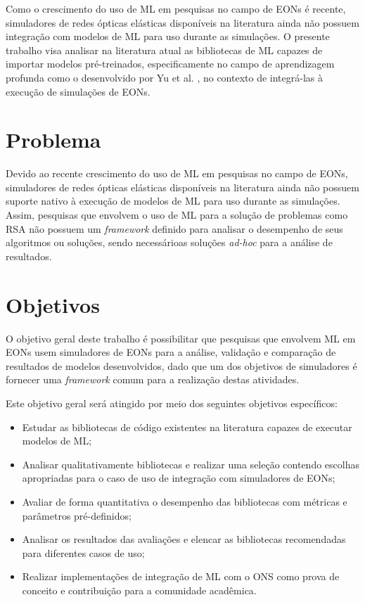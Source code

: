 Como o crescimento do uso de ML em pesquisas no campo de EONs é recente, simuladores de redes ópticas elásticas disponíveis na literatura ainda não possuem integração com modelos de ML para uso durante as simulações. O presente trabalho visa analisar na literatura atual as bibliotecas de ML capazes de importar modelos pré-treinados, especificamente no campo de aprendizagem profunda como o desenvolvido por Yu et al. \cite{eon_ml_rsa_dl_2019}, no contexto de integrá-las à execução de simulações de EONs.

\section{Problema}
\label{intro-problem}

Devido ao recente crescimento do uso de ML em pesquisas no campo de EONs, simuladores de redes ópticas elásticas disponíveis na literatura ainda não possuem suporte nativo à execução de modelos de ML para uso durante as simulações. Assim, pesquisas que envolvem o uso de ML para a solução de problemas como RSA não possuem um \textit{framework} definido para analisar o desempenho de seus algoritmos ou soluções, sendo necessárioas soluções \textit{ad-hoc} para a análise de resultados.

\section{Objetivos}
\label{intro-goals}

O objetivo geral deste trabalho é possibilitar que pesquisas que envolvem ML em EONs usem simuladores de EONs para a análise, validação e comparação de resultados de modelos desenvolvidos, dado que um dos objetivos de simuladores é fornecer uma \textit{framework} comum para a realização destas atividades.

Este objetivo geral será atingido por meio dos seguintes objetivos específicos:

\begin{itemize}
  \item Estudar as bibliotecas de código existentes na literatura capazes de executar modelos de ML;
  \item Analisar qualitativamente bibliotecas e realizar uma seleção contendo escolhas apropriadas para o caso de uso de integração com simuladores de EONs;
  \item Avaliar de forma quantitativa o desempenho das bibliotecas com métricas e parâmetros pré-definidos;
  \item Analisar os resultados das avaliações e elencar as bibliotecas recomendadas para diferentes casos de uso;
  \item Realizar implementações de integração de ML com o ONS como prova de conceito e contribuição para a comunidade acadêmica.
\end{itemize}

